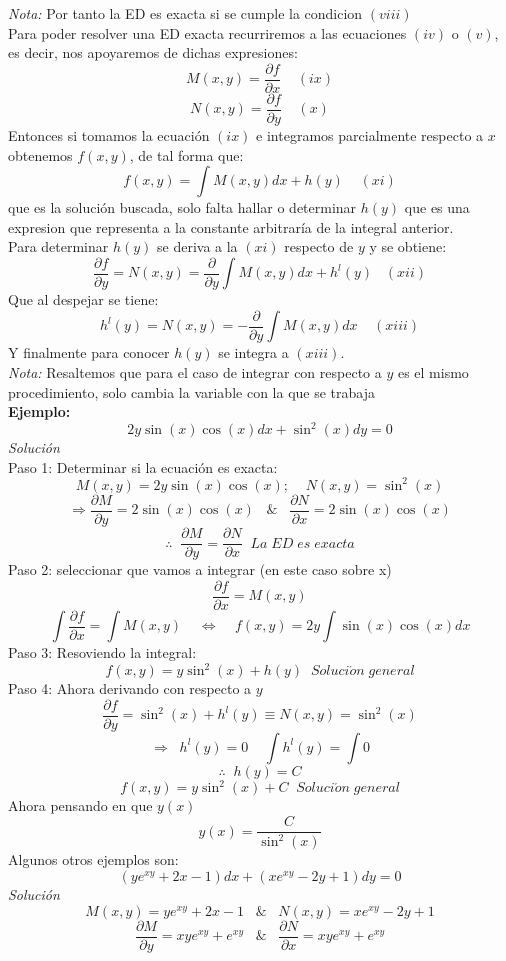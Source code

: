 \documentclass[10pt,executivepaper]{article}
\begin{document}
\textit{Nota:} Por tanto la ED es exacta si se cumple la condicion $(viii)$\\
Para poder resolver una ED exacta recurriremos a las ecuaciones $(iv)$ o $(v)$, es decir, nos apoyaremos de dichas expresiones:
\[M(x,y)=\frac{\partial{f}}{\partial{x}}\;\;\;\;(ix)\]
\[N(x,y)=\frac{\partial{f}}{\partial{y}}\;\;\;\;(x)\]
Entonces si tomamos la ecuación $(ix)$ e integramos parcialmente respecto a $x$ obtenemos $f(x,y)$, de tal forma que:
\[f(x,y)=\int M(x,y)dx+h(y)\;\;\;\;(xi)\]
que es la solución buscada, solo falta hallar o determinar $h(y)$ que es una expresion que representa a la constante arbitraría de la integral anterior.
\\
Para determinar $h(y)$ se deriva a la $(xi)$ respecto de $y$ y se obtiene:
\[\frac{\partial{f}}{\partial{y}}=N(x,y)=\frac{\partial}{\partial{y}}\int M(x,y)dx + h^{l}(y)\;\;\;(xii)\]
Que al despejar se tiene:
\[h^{l}(y)=N(x,y)=-\frac{\partial}{\partial{y}}\int M(x,y)dx\;\;\;\;(xiii)\]
Y finalmente para conocer $h(y)$ se integra a $(xiii)$.
\\
\textit{Nota: }Resaltemos que para el caso de integrar con respecto a $y$ es el mismo procedimiento, solo cambia la variable con la que se trabaja\\
\clearpage
\textbf{Ejemplo:}
\\
\[2y\sin(x)\cos(x)dx+\sin^{2}(x)dy=0\]
\textit{Solución}\\
Paso 1: Determinar si la ecuación es exacta:
\[M(x,y)=2y\sin(x)\cos(x);\;\;\;\;N(x,y)=\sin^{2}(x)\]
\[\Rightarrow \frac{\partial{M}}{\partial{y}}=2\sin(x)\cos(x)\;\;\;\&\;\;\;\frac{\partial{N}}{\partial{x}}=2\sin(x)\cos(x)\]
\[\therefore\;\;\frac{\partial{M}}{\partial{y}}=\frac{\partial{N}}{\partial{x}}\;\;La\;ED\;es\;exacta\]
Paso 2: seleccionar que vamos a integrar (en este caso sobre x)
\[\frac{\partial{f}}{\partial{x}}=M(x,y)\]
\[\int\frac{\partial{f}}{\partial{x}}=\int M(x,y)\;\;\;\;\Leftrightarrow\;\;\;\;f(x,y)=2y\int\sin(x)\cos(x)dx\]
Paso 3: Resoviendo la integral:
\[f(x,y)=y\sin^{2}(x)+h(y)\;\;Soluci\acute{o}n\;general\]
Paso 4: Ahora derivando con respecto a $y$
\[\frac{\partial{f}}{\partial{y}}=\sin^{2}(x)+h^{l}(y)\equiv N(x,y)=\sin^{2}(x)\]
\[\Rightarrow\;\;h^{l}(y)=0\;\;\;\;\int h^{l}(y)=\int 0\]
\[\therefore\;\;h(y)=C\]
\[f(x,y)=y\sin^{2}(x)+C\;\;Soluci\acute{o}n\;general\]
Ahora pensando en que $y(x)$
\[y(x)=\frac{C}{\sin^{2}(x)}\]
\clearpage
Algunos otros ejemplos son:
\[(ye^{xy}+2x-1)dx+(xe^{xy}-2y+1)dy=0\]
\textit{Solución}
\[M(x,y)=ye^{xy}+2x-1\;\;\;\&\;\;\;N(x,y)=xe^{xy}-2y+1\]
\[\frac{\partial{M}}{\partial{y}}=xye^{xy}+e^{xy}\;\;\;\&\;\;\;\frac{\partial{N}}{\partial{x}}=xye^{xy}+e^{xy}\]
\end{document}
